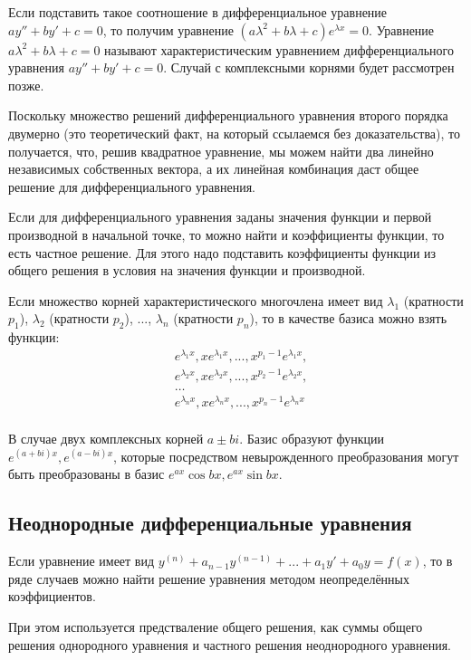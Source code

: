\documentclass[12pt]{article}
\begin{document}
Если подставить такое соотношение в дифференциальное уравнение $ay'' + by' + c = 0$, то получим уравнение $(a\lambda^2 + b\lambda + c)e^{\lambda x} = 0$.
Уравнение $a\lambda^2 + b\lambda + c = 0$ называют характеристическим уравнением дифференциального уравнения $ay'' + by' + c = 0$. Случай с комплексными корнями будет рассмотрен позже.

Поскольку множество решений дифференциального уравнения второго порядка двумерно (это теоретический факт, на который ссылаемся без доказательства), то получается, что, решив квадратное уравнение, мы можем найти два линейно независимых собственных вектора, а их линейная комбинация даст общее решение для дифференциального уравнения.

Если для дифференциального уравнения заданы значения функции и первой производной в начальной точке, то можно найти и коэффициенты функции, то есть частное решение. Для этого надо подставить коэффициенты функции из общего решения в условия на значения функции и производной.

Если множество корней характеристического многочлена имеет вид $\lambda_1$ (кратности $p_1$), $\lambda_2$ (кратности $p_2$), ..., $\lambda_n$ (кратности $p_n$), то в качестве базиса можно взять функции:
\begin{align*}
     & e^{\lambda_1 x}, xe^{\lambda_1 x}, ..., x^{p_1 - 1}e^{\lambda_1 x}, \\
     & e^{\lambda_2 x}, xe^{\lambda_2 x}, ..., x^{p_2 - 1}e^{\lambda_2 x}, \\
     & \dots                                                               \\
     & e^{\lambda_n x}, xe^{\lambda_n x}, ..., x^{p_n - 1}e^{\lambda_n x}  \\
\end{align*}

В случае двух комплексных корней $a \pm bi$. Базис образуют функции $e^{(a + bi)x}, e^{(a - bi)x}$, которые посредством невырожденного преобразования могут быть преобразованы в базис $e^{ax}\cos{bx}, e^{ax}\sin{bx}$.

\subsection{Неоднородные дифференциальные уравнения}
Если уравнение имеет вид $y^{(n)} + a_{n-1}y^{(n - 1)} + ... + a_1y' + a_0y = f(x)$, то в ряде случаев можно найти решение уравнения методом неопределённых коэффициентов.

При этом используется предстваление общего решения, как суммы общего решения однородного уравнения и частного решения неоднородного уравнения.
\end{document}
